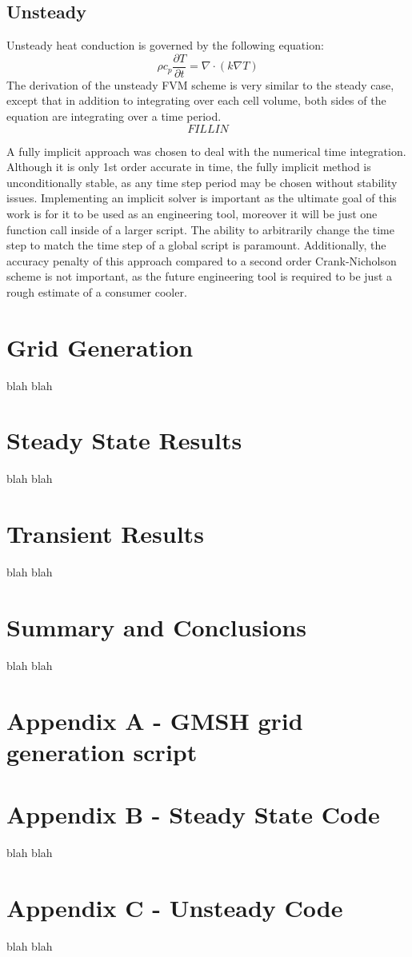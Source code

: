 \documentclass[11pt]{article}
\begin{document}
\subsection{Unsteady}
\label{sec:org9647855}
Unsteady heat conduction is governed by the following equation:
\[
\rho c_{p} \frac{\partial T}{\partial t} =\nabla \cdot ( k\nabla T )
\]
The derivation of the unsteady FVM scheme is very similar to the steady case, except that in addition to integrating over each cell volume, both sides of the equation are integrating over a time period.
\[
FILL IN
\]

A fully implicit approach was chosen to deal with the numerical time integration. Although it is only 1st order accurate in time, the fully implicit method is unconditionally stable, as any time step period may be chosen without stability issues. Implementing an implicit solver is important as the ultimate goal of this work is for it to be used as an engineering tool, moreover it will be just one function call inside of a larger script. The ability to arbitrarily change the time step to match the time step of a global script is paramount. Additionally, the accuracy penalty of this approach compared to a second order Crank-Nicholson scheme is not important, as the future engineering tool is required to be just a rough estimate of a consumer cooler.  

\section{Grid Generation}
\label{sec:org1e03d6b}
blah blah \cite{versteeg1995introduction}  
\section{Steady State Results}
\label{sec:org7b48318}
blah blah
\section{Transient Results}
\label{sec:org877e0d1}
blah blah
\section{Summary and Conclusions}
\label{sec:org3279b62}
blah blah 
\newpage
\section{Appendix A - GMSH grid generation script}
\label{sec:org436b19a}

\nepage
\section{Appendix B - Steady State Code}
\label{sec:org43dd9dc}
blah blah
\newpage
\section{Appendix C - Unsteady Code}
\label{sec:org3e385a1}
blah blah   
\newpage



\end{document}
